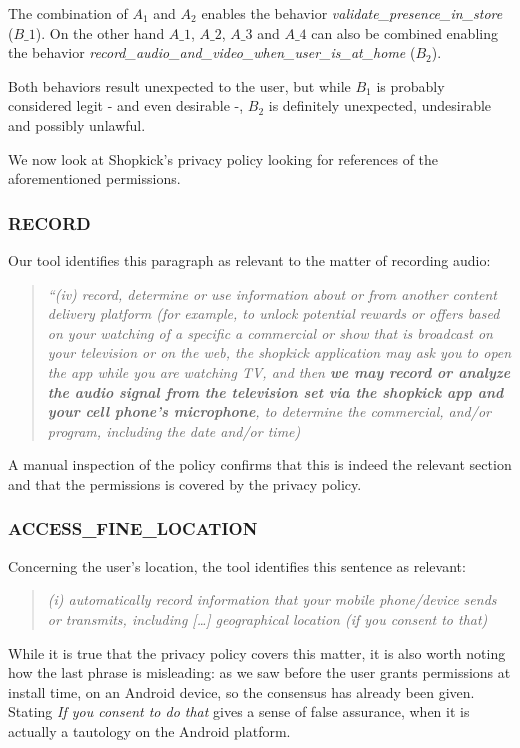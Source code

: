 \documentclass[twoside,letterpaper]{soups}
\theoremstyle{definition}
\begin{document}
The combination of $A_1$ and $A_2$ enables the behavior \emph{validate\_presence\_in\_store} ($B\_1$). On the other hand $A\_1$, $A\_2$, $A\_3$ and $A\_4$ can also be combined enabling the behavior \emph{record\_audio\_and\_video\_when\_user\_is\_at\_home} ($B_2$).

Both behaviors result unexpected to the user, but while $B_1$ is probably considered legit - and even desirable -, $B_2$ is definitely unexpected, undesirable and possibly unlawful.

We now look at Shopkick's privacy policy looking for references of the aforementioned permissions.

\subsubsection{RECORD}
Our tool identifies this paragraph as relevant to the matter of recording audio:

\begin{quote}
{\emph{“(iv) record, determine or use information about or from another content delivery platform (for example, to unlock potential rewards or offers based on your watching of a specific a commercial or show that is broadcast on your television or on the web, the shopkick application may ask you to open the app while you are watching TV, and then \textbf{we may record or analyze the audio signal from the television set via the shopkick app and your cell phone’s microphone}, to determine the commercial, and/or program, including the date and/or time)}}
\end{quote}

A manual inspection of the policy confirms that this is indeed the relevant section and that the permissions is covered by the privacy policy.

\subsubsection{ACCESS\_FINE\_LOCATION}
Concerning the user's location, the tool identifies this sentence as relevant:

\begin{quote}
{\emph{(i) automatically record information that your mobile phone/device sends or transmits, including […] geographical location (if you consent to that)}}
\end{quote}

While it is true that the privacy policy covers this matter, it is also worth noting how the last phrase is misleading: as we saw before the user grants permissions at install time, on an Android device, so the consensus has already been given. Stating \emph{If you consent to do that} gives a sense of false assurance, when it is actually a tautology on the Android platform.
\end{document}
